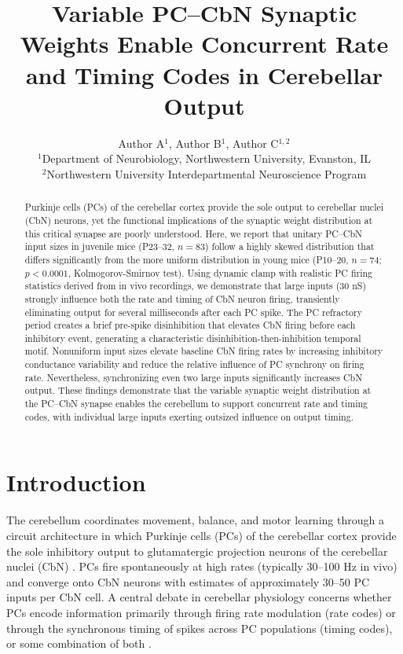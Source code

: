 \documentclass[12pt]{article}
\title{Variable PC--CbN Synaptic Weights Enable Concurrent Rate and Timing Codes in Cerebellar Output}
\author{Author A$^{1}$, Author B$^{1}$, Author C$^{1,2}$ \\
\small $^{1}$Department of Neurobiology, Northwestern University, Evanston, IL \\
\small $^{2}$Northwestern University Interdepartmental Neuroscience Program}
\date{}
\begin{document}
\maketitle

\begin{abstract}
Purkinje cells (PCs) of the cerebellar cortex provide the sole output to cerebellar nuclei (CbN) neurons, yet the functional implications of the synaptic weight distribution at this critical synapse are poorly understood. Here, we report that unitary PC--CbN input sizes in juvenile mice (P23--32, $n = 83$) follow a highly skewed distribution that differs significantly from the more uniform distribution in young mice (P10--20, $n = 74$; $p < 0.0001$, Kolmogorov-Smirnov test). Using dynamic clamp with realistic PC firing statistics derived from in vivo recordings, we demonstrate that large inputs (30 nS) strongly influence both the rate and timing of CbN neuron firing, transiently eliminating output for several milliseconds after each PC spike. The PC refractory period creates a brief pre-spike disinhibition that elevates CbN firing before each inhibitory event, generating a characteristic disinhibition-then-inhibition temporal motif. Nonuniform input sizes elevate baseline CbN firing rates by increasing inhibitory conductance variability and reduce the relative influence of PC synchrony on firing rate. Nevertheless, synchronizing even two large inputs significantly increases CbN output. These findings demonstrate that the variable synaptic weight distribution at the PC--CbN synapse enables the cerebellum to support concurrent rate and timing codes, with individual large inputs exerting outsized influence on output timing.
\end{abstract}

\section{Introduction}

The cerebellum coordinates movement, balance, and motor learning through a circuit architecture in which Purkinje cells (PCs) of the cerebellar cortex provide the sole inhibitory output to glutamatergic projection neurons of the cerebellar nuclei (CbN) \citep{ito2006cerebellar}. PCs fire spontaneously at high rates (typically 30--100 Hz in vivo) and converge onto CbN neurons with estimates of approximately 30--50 PC inputs per CbN cell. A central debate in cerebellar physiology concerns whether PCs encode information primarily through firing rate modulation (rate codes) or through the synchronous timing of spikes across PC populations (timing codes), or some combination of both \citep{heck2013cerbellar, deschutter1999cerebellar}.
\end{document}

